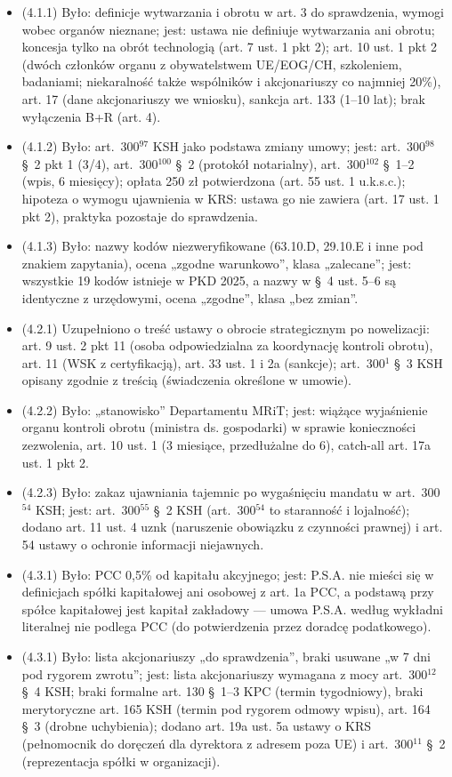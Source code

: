 \documentclass[12pt,a4paper]{report}
\begin{document}
\begin{itemize}
  \item (4.1.1) Było: definicje wytwarzania i obrotu w art. 3 do sprawdzenia, wymogi wobec organów nieznane; jest: ustawa nie definiuje wytwarzania ani obrotu; koncesja tylko na obrót technologią (art. 7 ust. 1 pkt 2); art. 10 ust. 1 pkt 2 (dwóch członków organu z obywatelstwem UE/EOG/CH, szkoleniem, badaniami; niekaralność także wspólników i akcjonariuszy co najmniej 20\%), art. 17 (dane akcjonariuszy we wniosku), sankcja art. 133 (1--10 lat); brak wyłączenia B+R (art. 4).
  \item (4.1.2) Było: art.~300$^{97}$ KSH jako podstawa zmiany umowy; jest: art.~300$^{98}$ §~2 pkt 1 (3/4), art.~300$^{100}$ §~2 (protokół notarialny), art.~300$^{102}$ §~1--2 (wpis, 6 miesięcy); opłata 250 zł potwierdzona (art. 55 ust. 1 u.k.s.c.); hipoteza o wymogu ujawnienia w KRS: ustawa go nie zawiera (art. 17 ust. 1 pkt 2), praktyka pozostaje do sprawdzenia.
  \item (4.1.3) Było: nazwy kodów niezweryfikowane (63.10.D, 29.10.E i inne pod znakiem zapytania), ocena „zgodne warunkowo”, klasa „zalecane”; jest: wszystkie 19 kodów istnieje w PKD 2025, a nazwy w §~4 ust. 5--6 są identyczne z urzędowymi, ocena „zgodne”, klasa „bez zmian”.
  \item (4.2.1) Uzupełniono o treść ustawy o obrocie strategicznym po nowelizacji: art. 9 ust. 2 pkt 11 (osoba odpowiedzialna za koordynację kontroli obrotu), art. 11 (WSK z certyfikacją), art. 33 ust. 1 i 2a (sankcje); art.~300$^{1}$ §~3 KSH opisany zgodnie z treścią (świadczenia określone w umowie).
  \item (4.2.2) Było: „stanowisko” Departamentu MRiT; jest: wiążące wyjaśnienie organu kontroli obrotu (ministra ds. gospodarki) w sprawie konieczności zezwolenia, art. 10 ust. 1 (3 miesiące, przedłużalne do 6), catch-all art. 17a ust. 1 pkt 2.
  \item (4.2.3) Było: zakaz ujawniania tajemnic po wygaśnięciu mandatu w art.~300$^{54}$ KSH; jest: art.~300$^{55}$ §~2 KSH (art.~300$^{54}$ to staranność i lojalność); dodano art. 11 ust. 4 uznk (naruszenie obowiązku z czynności prawnej) i art. 54 ustawy o ochronie informacji niejawnych.
  \item (4.3.1) Było: PCC 0,5\% od kapitału akcyjnego; jest: P.S.A. nie mieści się w definicjach spółki kapitałowej ani osobowej z art. 1a PCC, a podstawą przy spółce kapitałowej jest kapitał zakładowy --- umowa P.S.A. według wykładni literalnej nie podlega PCC (do potwierdzenia przez doradcę podatkowego).
  \item (4.3.1) Było: lista akcjonariuszy „do sprawdzenia”, braki usuwane „w 7 dni pod rygorem zwrotu”; jest: lista akcjonariuszy wymagana z mocy art.~300$^{12}$ §~4 KSH; braki formalne art. 130 §~1--3 KPC (termin tygodniowy), braki merytoryczne art. 165 KSH (termin pod rygorem odmowy wpisu), art. 164 §~3 (drobne uchybienia); dodano art. 19a ust. 5a ustawy o KRS (pełnomocnik do doręczeń dla dyrektora z adresem poza UE) i art.~300$^{11}$ §~2 (reprezentacja spółki w organizacji).

\end{itemize}
\end{document}

